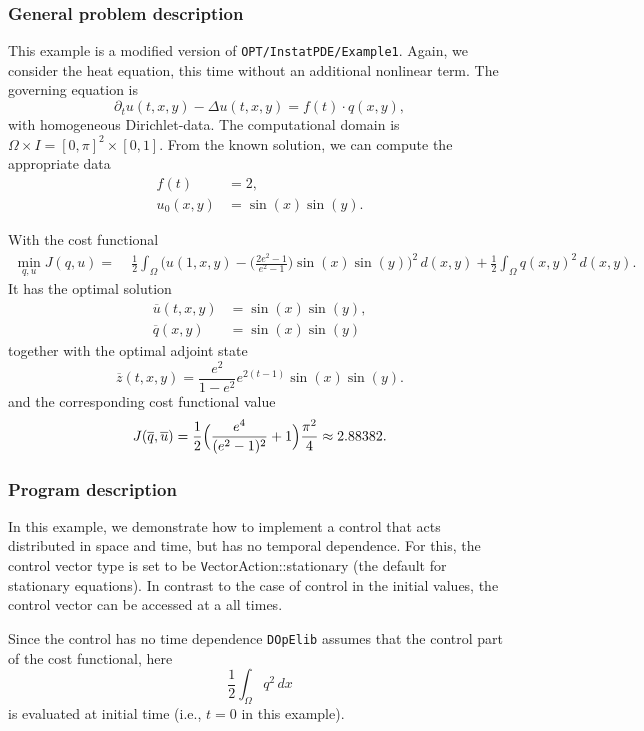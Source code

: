 \subsubsection{General problem description}

This example is a modified version of \texttt{OPT/InstatPDE/Example1}. 
Again, we consider the heat equation, this time without an additional nonlinear
term. The governing equation is
\begin{equation*}
\partial_t u(t,x,y) - \Delta u(t,x,y) = f(t)\cdot q(x,y),
\end{equation*}
with homogeneous Dirichlet-data.
The computational domain is $\Omega \times I = [0,\pi]^2 \times [0,1]$. From the known solution, we can compute the appropriate data 
\begin{align*}
f(t) &= 2,\\
u_0(x,y) &= \sin(x)\sin(y).
\end{align*}

With the cost functional 
\begin{align*}
 \min_{q,u} J(q,u) =&\; \frac{1}{2}\int_{\Omega} \Biggl(u(1,x,y) - \biggl(\frac{2e^2-1}{e^2-1}\biggr)\sin(x) \sin(y)\Biggr)^2\,d(x,y) + \frac{1}{2} \int_{\Omega} q(x,y)^2\,d(x,y).
\end{align*}
It has the optimal solution 
\begin{align*}
\overline{u}(t,x,y) &= \sin(x) \sin(y),\\
\overline{q}(x,y) &= \sin(x) \sin(y)
\end{align*}
together with the optimal adjoint state 
\[
 \overline{z}(t,x,y) = \frac{e^2}{1-e^2}e^{2(t-1)}\sin(x) \sin(y).
\]
and the corresponding cost functional value 
\[
J(\overline{q},\overline{u}) = \frac{1}{2} \Bigl(\frac{e^4}{(e^2-1)^2}+1\Bigr)\frac{\pi^2}{4} \approx 2.88382.
\]


\subsubsection{Program description}
In this example, we demonstrate how to implement a control that acts distributed in space and time,
but has no temporal dependence. For this, the control vector type is set to be 
{\texttt VectorAction::stationary} (the default for stationary equations). In contrast to 
the case of control in the initial values, the control vector can be accessed at a 
all times. 

Since the control has no time dependence \texttt{DOpElib} assumes that the control part of 
the cost functional, here 
\[
 \frac{1}{2}\int_\Omega q^2\,dx
\]
is evaluated at initial time (i.e., $t=0$ in this example). 